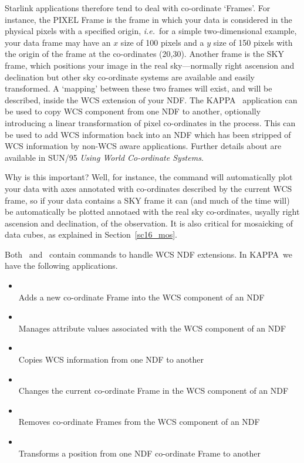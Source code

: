 \documentclass[twoside,11pt]{starlink}
\providecommand{\CCDPACK}{{\footnotesize CCDPACK}\normalsize}
\providecommand{\CCDPACKref}{\xref{\CCDPACK}{sun139}{}}
\providecommand{\KAPPA}{{\footnotesize KAPPA}\normalsize}
\providecommand{\KAPPAref}{\xref{\KAPPA}{sun95}{}}
\begin{document}
Starlink applications therefore tend to deal with co-ordinate
`Frames'.  For instance, the PIXEL Frame is the frame in which your
data is considered in the physical pixels with a specified origin,
\emph{i.e.}\ for a simple two-dimensional example, your data frame may
have an $x$ size of 100 pixels and a $y$ size of 150 pixels with the
origin of the frame at the co-ordinates (20,30).  Another frame is the
SKY frame, which positions your image in the real sky---normally
right ascension and declination but other sky co-ordinate systems are
available and easily transformed.  A `mapping' between these two
frames will exist, and will be described, inside the WCS extension of
your NDF.  The \KAPPA\  application can
be used to copy WCS component from one NDF to another, optionally
introducing a linear transformation of pixel co-ordinates in the
process.  This can be used to add WCS information back into an NDF
which has been stripped of WCS information by non-WCS aware
applications.  Further details about 
are available in SUN/95 \emph{Using World Co-ordinate
Systems}.

Why is this important?  Well, for instance, the
 command will automatically plot your
data with axes annotated with co-ordinates described by the current
WCS frame, so if your data contains a SKY frame it can (and much of
the time will) be automatically be plotted annotaed with the real sky
co-ordinates, usyally right ascension and declination, of the
observation.  It is also critical for mosaicking of data cubes, as
explained  in Section~\ref{sc16_mos}.

Both \KAPPAref\ and \CCDPACKref\ contain commands to handle WCS NDF
extensions.  In \KAPPA\ we have the following applications.

\begin{itemize}
\item{}\\
Adds a new co-ordinate Frame into the WCS component of an NDF
\item{}\\
Manages attribute values associated with the WCS component of an NDF
\item{}\\
Copies WCS information from one NDF to another
\item{}\\
Changes the current co-ordinate Frame in the WCS component of an NDF
\item{}\\
Removes co-ordinate Frames from the WCS component of an NDF
\item{}\\
Transforms a position from one NDF co-ordinate Frame to another
\end{itemize}
\end{document}
